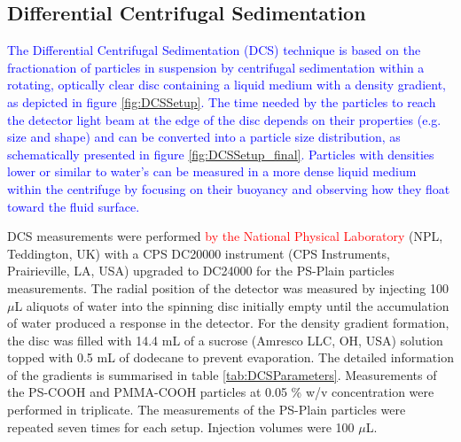 \subsection{Differential Centrifugal Sedimentation}
\label{sec:DCS_experimental}

\textcolor{blue}{The Differential Centrifugal Sedimentation (DCS) technique is based on the fractionation of particles in suspension by centrifugal sedimentation within a rotating, optically clear disc containing a liquid medium with a density gradient, as depicted in figure \ref{fig:DCSSetup}. The time needed by the particles to reach the detector light beam at the edge of the disc depends on their properties (e.g. size and shape) and can be converted into a particle size distribution, as schematically presented in figure \ref{fig:DCSSetup_final}. Particles with densities lower or similar to water's can be measured in a more dense liquid medium within the centrifuge by focusing on their buoyancy and observing how they float toward the fluid surface.}

DCS measurements were performed \textcolor{red}{by the National Physical Laboratory} (NPL, Teddington, UK) with a CPS DC20000 instrument (CPS Instruments, Prairieville, LA, USA) upgraded to DC24000 for the PS-Plain particles measurements. The radial position of the detector was measured by injecting 100 $\mu$L aliquots of water into the spinning disc initially empty until the accumulation of water produced a response in the detector. For the density gradient formation, the disc was filled with 14.4 mL of a sucrose (Amresco LLC, OH, USA) solution topped with 0.5 mL of dodecane to prevent evaporation. The detailed information of the gradients is summarised in table \ref{tab:DCSParameters}. Measurements of the PS-COOH and PMMA-COOH particles at 0.05 \% w/v concentration were performed in triplicate. The measurements of the PS-Plain particles were repeated seven times for each setup. Injection volumes were 100 $\mu$L.

